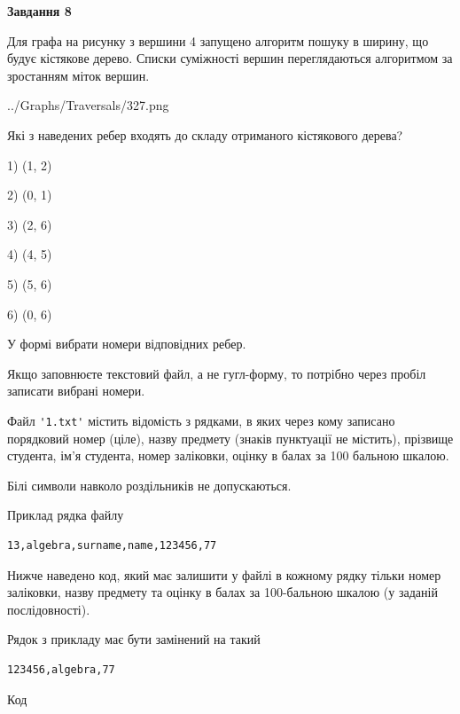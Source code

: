 \documentclass[12pt, ukrainian]{article}
\def\code#1{\Verb!#1!}
\begin{document}
{\begin {large}
{\begin {center}\textbf{Завдання 8}\end {center}}\par
Для графа на рисунку з вершини 4 запущено алгоритм пошуку в ширину, що будує кістякове дерево. Списки суміжності вершин переглядаються алгоритмом за зростанням міток вершин.\par
\begin{center}
	{../Graphs/Traversals/327.png}
\end{center}
\par Які з наведених ребер входять до складу отриманого кістякового дерева?\par
1) (1, 2)\par
2) (0, 1)\par
3) (2, 6)\par
4) (4, 5)\par
5) (5, 6)\par
6) (0, 6)\par
{\vskip 15pt} У формі вибрати номери відповідних ребер.


Якщо заповнюєте текстовий файл, а не гугл-форму, то потрібно через пробіл записа\-ти вибрані номери.\par
\newpage


Файл \code{'1.txt'} містить відомість з рядками, в яких через кому записа\-но поряд\-ковий номер (ціле), назву предмету (знаків пунктуації не містить), прізвище студента, ім'я студента, номер заліковки, оцінку в балах за 100 бальною шкалою.

Білі символи навколо роздільників не допускаються.

Приклад рядка файлу



\begin{verbatim}
13,algebra,surname,name,123456,77
\end{verbatim}


Нижче наведено код, який має залишити у файлі в кожному рядку тільки номер заліковки, назву предмету та оцінку в балах за 100-бальною шкалою (у заданій послі\-дов\-ності).

Рядок з прикладу має бути замінений на такий



\begin{verbatim}
123456,algebra,77
\end{verbatim}




Код




\end{large}}
\end{document}

